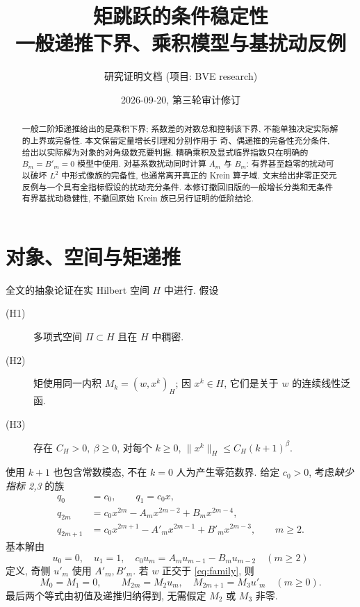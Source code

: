 \documentclass[UTF8]{ctexart}
\title{矩跳跃的条件稳定性\\ \large 一般递推下界、乘积模型与基扰动反例}
\author{研究证明文档 (项目: BVE research)}
\date{2026-09-20, 第三轮审计修订}
\begin{document}
\maketitle
\begin{abstract}
一般二阶矩递推给出的是乘积下界; 系数差的对数总和控制该下界,
不能单独决定实际解的上界或完备性. 本文保留定量增长引理和分别作用于
奇、偶递推的完备性充分条件, 给出以实际解为对象的对角级数充要判据.
精确乘积及显式临界指数只在明确的 $B_m=B'_m=0$ 模型中使用.
对基系数扰动同时计算 $A_m$ 与 $B_m$: 有界甚至趋零的扰动可以破坏
$L^2$ 中形式像族的完备性, 也通常离开真正的 Krein 算子域.
文末给出非零正交元反例与一个具有全指标假设的扰动充分条件.
本修订撤回旧版的一般增长分类和无条件有界基扰动稳健性,
不撤回原始 Krein 族已另行证明的低阶结论.
\end{abstract}
\tableofcontents

\section{对象、空间与矩递推}

全文的抽象论证在实 Hilbert 空间 $H$ 中进行. 假设
\begin{description}
\item[(H1)] 多项式空间 $\Pi\subset H$ 且在 $H$ 中稠密.
\item[(H2)] 矩使用同一内积 $M_k=(w,x^k)_H$; 因 $x^k\in H$,
它们是关于 $w$ 的连续线性泛函.
\item[(H3)] 存在 $C_H>0,\ \beta\ge0$, 对每个 $k\ge0$,
$\|x^k\|_H\le C_H(k+1)^\beta$.
\end{description}
使用 $k+1$ 也包含常数模态, 不在 $k=0$ 人为产生零范数界.
给定 $c_0>0$, 考虑\emph{缺少指标 2,3} 的族
\begin{equation}\label{eq:family}
\begin{aligned}
q_0&=c_0,\qquad q_1=c_0x,\\
q_{2m}&=c_0x^{2m}-A_mx^{2m-2}+B_mx^{2m-4},\\
q_{2m+1}&=c_0x^{2m+1}-A'_mx^{2m-1}+B'_mx^{2m-3},
\qquad m\ge2 .
\end{aligned}
\end{equation}
基本解由
\begin{equation}\label{eq:recurrence}
u_0=0,\quad u_1=1,\quad
c_0u_m=A_mu_{m-1}-B_mu_{m-2}\quad(m\ge2)
\end{equation}
定义, 奇侧 $u'_m$ 使用 $A'_m,B'_m$.
若 $w$ 正交于 \eqref{eq:family}, 则
\begin{equation}\label{eq:moments}
M_0=M_1=0,\qquad M_{2m}=M_2u_m,\quad M_{2m+1}=M_3u'_m
\quad(m\ge0).
\end{equation}
最后两个等式由初值及递推归纳得到, 无需假定 $M_2$ 或 $M_3$ 非零.
\end{document}
